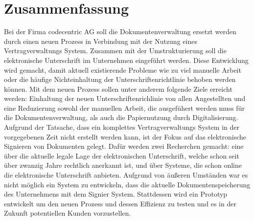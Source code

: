 \section*{Zusammenfassung}
Bei der Firma codecentric AG soll die Dokumentenverwaltung ersetzt werden durch einen neuen Prozess in Verbindung mit der Nutzung eines Vertragverwaltungs System. Zusammen mit der Umstrukturierung soll die elektronische Unterschrift im Unternehmen eingeführt werden. Diese Entwicklung wird gemacht, damit aktuell existierende Probleme wie zu viel manuelle Arbeit oder die häufige Nichteinhaltung der Unterschriftenrichtlinie behoben werden können. \newline
Mit dem neuen Prozess sollen unter anderem folgende Ziele erreicht werden: Einhaltung der neuen Unterschriftenrichlinie von allen Angestellten und eine Reduzierung sowohl der manuellen Arbeit, die ausgefühert werden muss für die Dokumentenverwaltung, als auch die Papiernutzung durch Digitalisierung. Aufgrund der Tatsache, dass ein komplettes Vertragverwaltungs System in der vorgegebenen Zeit nicht erstellt werden kann, ist der Fokus auf das elektronische Signieren von Dokumenten gelegt. Dafür werden zwei Recherchen gemacht: eine über die aktuelle legale Lage der elektronischen Unterschrift, welche schon seit über zwanzig Jahre rechtlich anerkannt ist, und über Systeme, die schon online die elektronische Unterschrift anbieten. \newline
Aufgrund von äußeren Umständen war es nicht möglich ein System zu entwickeln, dass die aktuelle Dokumentenspeicherung des Unternehmens mit dem Signier System. Stattdessen wird ein Prototyp entwickelt um den neuen Prozess und dessen Effizienz zu testen und es in der Zukunft potentiellen Kunden vorzustellen.
